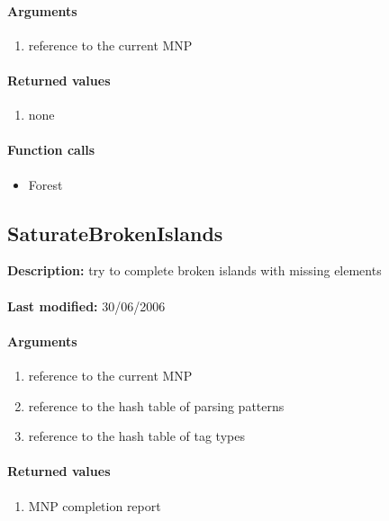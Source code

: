\paragraph{Arguments}
\begin{enumerate}
\item reference to the current MNP
\end{enumerate}

\paragraph{Returned values}
\begin{enumerate}
\item none
\end{enumerate}

\paragraph{Function calls}
\begin{itemize}
\item Forest
\end{itemize}

\subsection{SaturateBrokenIslands}
\textbf{Description:} try to complete broken islands with missing elements\\
\\\textbf{Last modified:} 30/06/2006

\paragraph{Arguments}
\begin{enumerate}
\item reference to the current MNP
\item reference to the hash table of parsing patterns
\item reference to the hash table of tag types
\end{enumerate}

\paragraph{Returned values}
\begin{enumerate}
\item MNP completion report
\end{enumerate}

